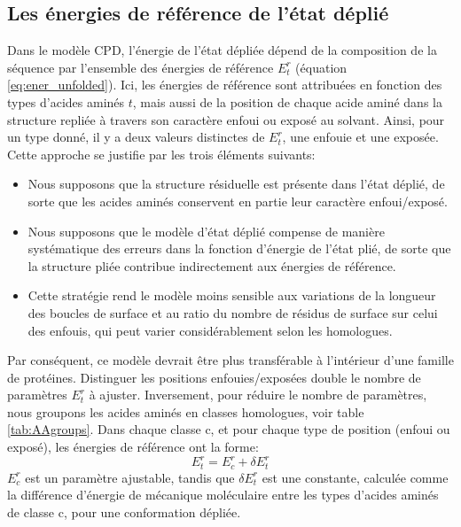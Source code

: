 \subsection{Les énergies de référence de l'état déplié}

Dans le modèle CPD, l'énergie de l'état dépliée dépend de la composition de la séquence par l'ensemble des énergies de référence $E^r_t$ (équation \ref{eq:ener_unfolded}). Ici, les énergies de référence sont attribuées en fonction des types d'acides aminés $t$, mais aussi de la position de chaque acide aminé dans la structure repliée à travers son caractère enfoui ou exposé au solvant. Ainsi, pour un type donné, il y a deux valeurs distinctes de $E^r_t$, une enfouie et une exposée. Cette approche se justifie par les trois éléments suivants:

\begin{itemize}
\item Nous supposons que la structure résiduelle est présente dans l'état déplié, de sorte que les acides aminés conservent en partie leur caractère enfoui/exposé.
\item Nous supposons que le modèle d'état déplié compense de manière systématique des erreurs dans la fonction d'énergie de l'état plié, de sorte que  la structure pliée contribue indirectement aux énergies de référence.
\item Cette stratégie rend le modèle moins sensible aux variations de la longueur des boucles de surface et au ratio  du nombre de résidus de surface sur  celui des enfouis, qui peut varier considérablement selon les homologues.  
\end{itemize}
Par conséquent, ce modèle devrait être plus transférable à l'intérieur d'une famille de protéines. Distinguer les positions enfouies/exposées double le nombre de paramètres $E^r_t$ à ajuster. Inversement, pour réduire le nombre de paramètres, nous groupons les acides aminés en classes homologues, voir table \ref{tab:AAgroups}. Dans chaque classe c, et pour chaque type de position (enfoui ou exposé), les énergies de référence ont la forme:
\begin{equation}
E^r_t = E^r_c + \delta E^r_t
\end{equation}
$E^r_c$ est un paramètre ajustable, tandis que $\delta E^r_t$ est une constante, calculée comme la différence d'énergie de mécanique moléculaire entre les types d'acides aminés de classe c, pour une conformation dépliée.

